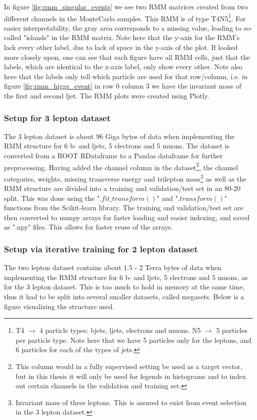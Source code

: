 In figure \ref{fig:rmm_singular_events} we see two RMM matrices created from two different channels in the MonteCarlo samples. 
This RMM is of type T4N5\footnote{T4 $\to$ 4 particle types: bjets, ljets, electrons and muons. N5 $\to$ 5 particles per 
particle type. Note here that we have 5 particles only for the leptons, and 6 particles for each of the types of jets.}. 
 For easier interpretability, the gray area corresponds to a missing value, leading to so-called "islands" in the RMM matrix.
 Note here that the y-axis for the RMM's lack every other label, due to lack of space in the y-axis of the plot. If looked more closely upon, one can see that 
 each figure have all RMM cells, just that the labels, which are identical to the x-axis label, only show every other. Note also here that the labels only tell which particle are used for that row/column, i.e. 
 in figure \ref{fig:rmm_higgs_event} in row 0 column 3 we have the invariant mass of the first and second ljet. The RMM plots were created using 
 Plotly\cite{plotly}.


\subsubsection*{Setup for 3 lepton dataset}
The 3 lepton dataset is about 96 Giga bytes of data when implementing the RMM structure for 6 b- and ljets, 5 electrons and 5 muons. The dataset 
is converted from a ROOT RDataframe to a Pandas dataframe\cite{reback2020pandas} for further preprocessing. Having added the channel column in 
the dataset\footnote{This column would in a fully supervised setting be used as a target vector, but in this thesis it will only be used for legends in
histograms and to index out certain channels in the validation and training set. }, the channel categories, weights, missing transverse energy and 
trilepton mass\footnote{Invariant mass of three leptons. This is assured to exist from event selection in the 3 lepton dataset.} as well as the RMM structure are divided into 
a training and validation/test set in an 80-20 split. This was done using the "$.fit\_transform()$" and "$.transform()$" functions from the 
Scikit-learn library\cite{scikit-learn}. The training and validation/test set are then converted to numpy arrays\cite{harris2020array} for faster 
loading and easier indexing, and saved as ".npy" files. This allows for faster reuse of the arrays. 

\subsubsection*{Setup via iterative training for 2 lepton dataset}
The two lepton dataset contains about 1.5 - 2 Terra bytes of data when implementing the RMM structure for 6 
b- and ljets, 5 electrons and 5 muons, as for the 3 lepton dataset. This is too much to hold in memory at the same time, thus it had to 
be split into several smaller datasets, called megasets. Below is a figure visualizing the structure used. 


